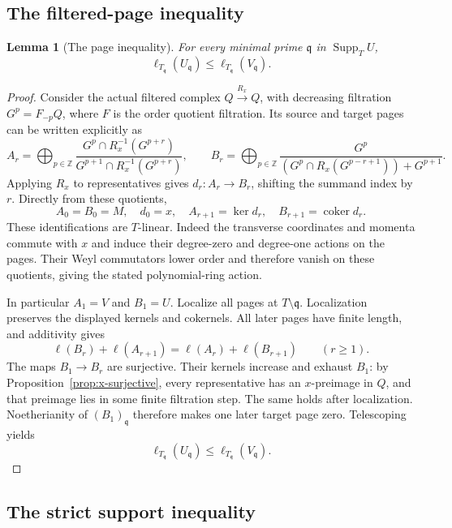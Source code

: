 \documentclass[11pt]{amsart}
\newtheorem{lemma}[theorem]{Lemma}
\theoremstyle{definition}
\begin{document}
\subsection{The filtered-page inequality}

\begin{lemma}[The page inequality]\label{lem:page-inequality}
For every minimal prime $\mathfrak q$ in $\operatorname{Supp}_T U$,
\[
 \ell_{T_{\mathfrak q}}(U_{\mathfrak q})
 \le \ell_{T_{\mathfrak q}}(V_{\mathfrak q}).
\]
\end{lemma}
\begin{proof}
Consider the actual filtered complex $Q\xrightarrow{R_x}Q$, with decreasing
filtration $G^p=F_{-p}Q$, where $F$ is the order quotient filtration.
Its source and target pages can be written explicitly as
\[
 A_r=\bigoplus_{p\in\mathbb Z}
 \frac{G^p\cap R_x^{-1}(G^{p+r})}
 {G^{p+1}\cap R_x^{-1}(G^{p+r})},\qquad
 B_r=\bigoplus_{p\in\mathbb Z}
 \frac{G^p}{(G^p\cap R_x(G^{p-r+1}))+G^{p+1}}.
\]
Applying $R_x$ to representatives gives $d_r:A_r\to B_r$, shifting
the summand index by $r$. Directly from these quotients,
\[
 A_0=B_0=M,\quad d_0=x,\quad
 A_{r+1}=\ker d_r,\quad B_{r+1}=\operatorname{coker}d_r.
\]
These identifications are $T$-linear. Indeed the transverse coordinates and
momenta commute with $x$ and induce their degree-zero and degree-one actions
on the pages. Their Weyl commutators lower order and therefore vanish on
these quotients, giving the stated polynomial-ring action.

In particular $A_1=V$ and $B_1=U$. Localize all pages at
$T\setminus\mathfrak q$. Localization preserves the displayed kernels
and cokernels. All later pages have finite length, and additivity gives
\[
 \ell(B_r)+\ell(A_{r+1})=\ell(A_r)+\ell(B_{r+1})\qquad(r\ge1).
\]
The maps $B_1\to B_r$ are surjective. Their kernels increase and exhaust
$B_1$: by Proposition~\ref{prop:x-surjective}, every representative has an
$x$-preimage in $Q$, and that preimage lies in some finite filtration step.
The same holds after localization. Noetherianity of $(B_1)_{\mathfrak q}$
therefore makes one later target page zero. Telescoping yields
\[
 \ell_{T_{\mathfrak q}}(U_{\mathfrak q})
 \le \ell_{T_{\mathfrak q}}(V_{\mathfrak q}).
\]

\end{proof}

\subsection{The strict support inequality}
\end{document}
